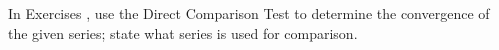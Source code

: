 {\noindent In Exercises}
{, use the Direct Comparison Test to determine the convergence of the given series; state what series is used for comparison.
}

